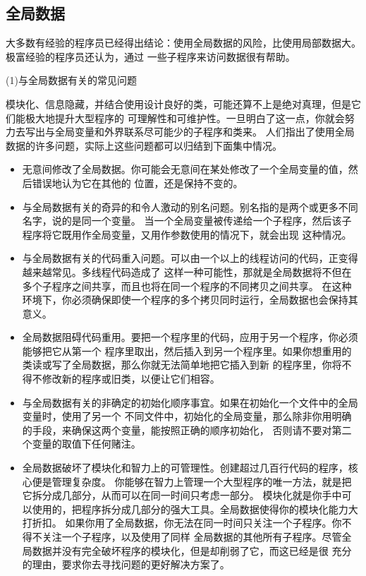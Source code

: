 \documentclass{article}
\begin{document}
\subsection{全局数据}
大多数有经验的程序员已经得出结论：使用全局数据的风险，比使用局部数据大。极富经验的程序员还认为，通过
一些子程序来访问数据很有帮助。
\par
(1)与全局数据有关的常见问题
\par
模块化、信息隐藏，并结合使用设计良好的类，可能还算不上是绝对真理，但是它们能极大地提升大型程序的
可理解性和可维护性。一旦明白了这一点，你就会努力去写出与全局变量和外界联系尽可能少的子程序和类来。
人们指出了使用全局数据的许多问题，实际上这些问题都可以归结到下面集中情况。
\begin{itemize}
    \item 无意间修改了全局数据。你可能会无意间在某处修改了一个全局变量的值，然后错误地认为它在其他的
    位置，还是保持不变的。
    \item 与全局数据有关的奇异的和令人激动的别名问题。别名指的是两个或更多不同名字，说的是同一个变量。
    当一个全局变量被传递给一个子程序，然后该子程序将它既用作全局变量，又用作参数使用的情况下，就会出现
    这种情况。
    \item 与全局数据有关的代码重入问题。可以由一个以上的线程访问的代码，正变得越来越常见。多线程代码造成了
    这样一种可能性，那就是全局数据将不但在多个子程序之间共享，而且也将在同一个程序的不同拷贝之间共享。
    在这种环境下，你必须确保即使一个程序的多个拷贝同时运行，全局数据也会保持其意义。
    \item 全局数据阻碍代码重用。要把一个程序里的代码，应用于另一个程序，你必须能够把它从第一个
    程序里取出，然后插入到另一个程序里。如果你想重用的类读或写了全局数据，那么你就无法简单地把它插入到新
    的程序里，你将不得不修改新的程序或旧类，以便让它们相容。
    \item 与全局数据有关的非确定的初始化顺序事宜。如果在初始化一个文件中的全局变量时，使用了另一个
    不同文件中，初始化的全局变量，那么除非你用明确的手段，来确保这两个变量，能按照正确的顺序初始化，
    否则请不要对第二个变量的取值下任何赌注。
    \item 全局数据破坏了模块化和智力上的可管理性。创建超过几百行代码的程序，核心便是管理复杂度。
    你能够在智力上管理一个大型程序的唯一方法，就是把它拆分成几部分，从而可以在同一时间只考虑一部分。
    模块化就是你手中可以使用的，把程序拆分成几部分的强大工具。全局数据使得你的模块化能力大打折扣。
    如果你用了全局数据，你无法在同一时间只关注一个子程序。你不得不关注一个子程序，以及使用了同样
    全局数据的其他所有子程序。尽管全局数据并没有完全破坏程序的模块化，但是却削弱了它，而这已经是很
    充分的理由，要求你去寻找问题的更好解决方案了。
\end{itemize}
\end{document}
